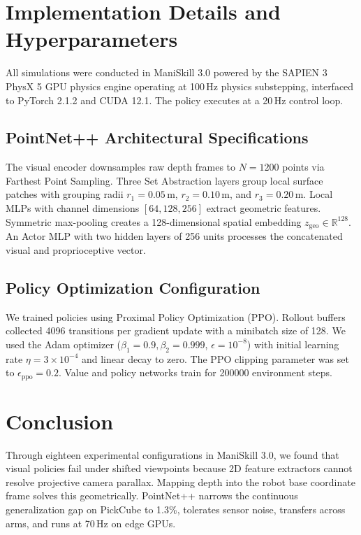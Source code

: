 \documentclass[conference]{IEEEtran}
\begin{document}
\section{Implementation Details and Hyperparameters}
All simulations were conducted in ManiSkill 3.0 \cite{maniskill} powered by the SAPIEN 3 PhysX 5 GPU physics engine operating at 100\,Hz physics substepping, interfaced to PyTorch 2.1.2 and CUDA 12.1. The policy executes at a 20\,Hz control loop.

\subsection{PointNet++ Architectural Specifications}
The visual encoder downsamples raw depth frames to $N=1200$ points via Farthest Point Sampling. Three Set Abstraction layers group local surface patches with grouping radii $r_1=0.05$\,m, $r_2=0.10$\,m, and $r_3=0.20$\,m. Local MLPs with channel dimensions $[64, 128, 256]$ extract geometric features. Symmetric max-pooling creates a 128-dimensional spatial embedding $z_{\text{geo}} \in \mathbb{R}^{128}$. An Actor MLP with two hidden layers of 256 units processes the concatenated visual and proprioceptive vector.

\subsection{Policy Optimization Configuration}
We trained policies using Proximal Policy Optimization (PPO). Rollout buffers collected 4096 transitions per gradient update with a minibatch size of 128. We used the Adam optimizer ($\beta_1=0.9, \beta_2=0.999$, $\epsilon=10^{-8}$) with initial learning rate $\eta = 3 \times 10^{-4}$ and linear decay to zero. The PPO clipping parameter was set to $\epsilon_{\text{ppo}} = 0.2$. Value and policy networks train for 200000 environment steps.

\section{Conclusion}
Through eighteen experimental configurations in ManiSkill 3.0, we found that visual policies fail under shifted viewpoints because 2D feature extractors cannot resolve projective camera parallax. Mapping depth into the robot base coordinate frame solves this geometrically. PointNet++ narrows the continuous generalization gap on PickCube to 1.3\%, tolerates sensor noise, transfers across arms, and runs at 70\,Hz on edge GPUs.
\end{document}

